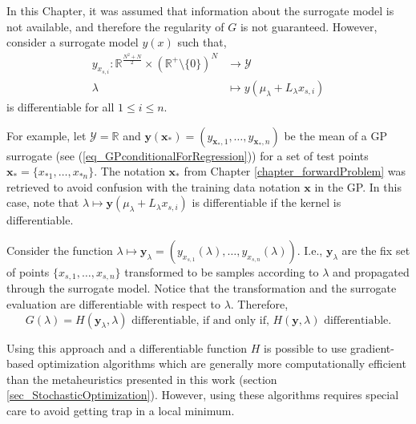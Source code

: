In this Chapter, it was assumed that information about the surrogate model is not available, and therefore the regularity of $G$ is not guaranteed. However, consider a surrogate model $y(x)$ such that,
\begin{equation} \label{eq_linearFunctionsToSamplingFromNormal}
 \begin{aligned}
  y_{x_{s,i}}: \mathbb{R}^{\frac{N^2+N}{2}} \times (\mathbb{R}^+\setminus\{0\})^N &\to \mathcal{Y} \\
                               \lambda  &\mapsto y(\mu_{\lambda} + L_{\lambda}x_{s,i})
 \end{aligned}
\end{equation}
is differentiable for all $1 \leq i \leq n$.

\begin{example}
For example, let $\mathcal{Y}=\mathbb{R}$ and $\pmb{y}(\pmb{x_*}) = (y_{\pmb{x_*},1}, \dots, y_{\pmb{x_*},n})$ be the mean of a GP surrogate (see (\ref{eq_GPconditionalForRegression})) for a set of test points $\pmb{x_*} = \{x_{*1},\dots,x_{*n}\}$.
The notation $\pmb{x_*}$ from Chapter \ref{chapter_forwardProblem} was retrieved to avoid confusion with the training data notation $\pmb{x}$ in the GP.
In this case, note that $\lambda \mapsto \pmb{y}(\mu_{\lambda} + L_{\lambda}x_{s,i})$ is differentiable if the kernel is differentiable.
\end{example}

Consider the function $\lambda \mapsto \pmb{y}_{\lambda} = (y_{x_{s,1}}(\lambda), \dots, y_{x_{s,n}}(\lambda))$. I.e., $\pmb{y}_{\lambda}$ are the fix set of points $\{x_{s,1},\dots,x_{s,n}\}$ transformed to be samples according to $\lambda$ and propagated through the surrogate model.
Notice that the transformation and the surrogate evaluation are differentiable with respect to $\lambda$.
Therefore, 
$$
  G(\lambda) = H(\pmb{y}_{\lambda},\lambda) \text{ differentiable, \ if and only if, \ }
  H(\pmb{y},\lambda) \text{ differentiable.}
$$   

Using this approach and a differentiable function $H$ is possible to use gradient-based optimization algorithms which are generally more computationally efficient than the metaheuristics presented in this work (section \ref{sec_StochasticOptimization}).
However, using these algorithms requires special care to avoid getting trap in a local minimum.


